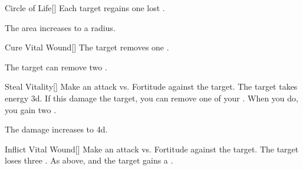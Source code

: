 \lowercase{\hypertarget{spell:Circle of Life}{}}\label{spell:Circle of Life}
\begin{freeability}[Rank 5]{\hypertarget{spell:Circle of Life}{Circle of Life}}[]
Each target regains one lost .

\rankline
{} The area increases to a \arealarge radius.

\end{freeability}
\vspace{0.25em}



\lowercase{\hypertarget{spell:Cure Vital Wound}{}}\label{spell:Cure Vital Wound}
\begin{freeability}[Rank 5]{\hypertarget{spell:Cure Vital Wound}{Cure Vital Wound}}[]
The target removes one .

\rankline
{} The target can remove two .

\end{freeability}
\vspace{0.25em}



\lowercase{\hypertarget{spell:Steal Vitality}{}}\label{spell:Steal Vitality}
\begin{freeability}[Rank 5]{\hypertarget{spell:Steal Vitality}{Steal Vitality}}[]
Make an attack vs. Fortitude against the target.
\hit The target takes energy  \plus3d.
If this damage  the target, you can remove one of your .
When you do, you gain two .

\rankline
{} The damage increases to  \plus4d.

\end{freeability}
\vspace{0.25em}



\lowercase{\hypertarget{spell:Inflict Vital Wound}{}}\label{spell:Inflict Vital Wound}
\begin{freeability}[Rank 7]{\hypertarget{spell:Inflict Vital Wound}{Inflict Vital Wound}}[]
Make an attack vs. Fortitude against the target.
\hit The target loses three .
\crit As above, and the target gains a .

\end{freeability}
\vspace{0.25em}



